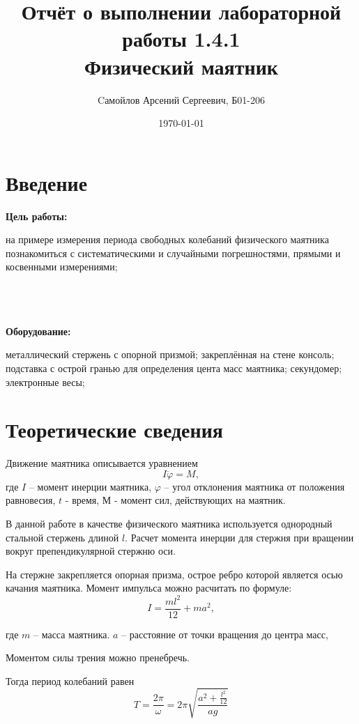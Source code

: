 \documentclass[a5paper, 11pt]{article}
\title{\textbf{Отчёт о выполнении лабораторной работы 1.4.1} \\
	Физический маятник}
\author{Cамойлов Арсений Сергеевич, Б01-206}
\date{\today}
\begin{document}
	
	\maketitle
	
	\section{Введение}
    \textbf{Цель работы:}
    
    
	на примере измерения периода свободных колебаний физического
	маятника познакомиться с систематическими и случайными погрешностями, прямыми и косвенными измерениями;
	 
	\\
	
	\\
	\\
	
	\textbf{Оборудование:} 
	
	
	металлический стержень с опорной призмой; закреплённая на стене консоль; подставка с острой гранью для определения цента масс маятника; секундомер; электронные весы; 
	\newpage
	\section{Теоретические сведения}
	
		
     Движение маятника описывается уравнением
	\begin{equation}
		I\ddot{\varphi}=M,
		\label{osnova}
	\end{equation}
	\noindent где $I$ -- момент инерции маятника, $\varphi$ -- угол отклонения маятника от положения равновесия, $t$ - время, М - момент сил, действующих на маятник.
	
	В данной работе в качестве физического маятника используется однородный стальной стержень длиной $l$. 
	Расчет момента инерции для стержня при вращении вокруг препендикулярной стержню оси. 
	
На стержне закрепляется опорная призма, острое ребро которой является осью качания маятника.
Момент импульса можно расчитать по формуле:
	\begin{equation}
		I=\frac{ml^2}{12}+ma^2,
	\end{equation}
	
	\noindent где $ m $ -- масса маятника. $ a $ -- расстояние от точки вращения до центра масс,

	
	\noindent  Моментом силы трения можно пренебречь. 
	
	Тогда период колебаний равен
	\begin{equation}\label{period1}
		T=\frac{2\pi}{\omega}=2\pi\sqrt{\frac{a^2+\frac{l^2}{12}}{ag}}
	\end{equation}
	
\end{document}

